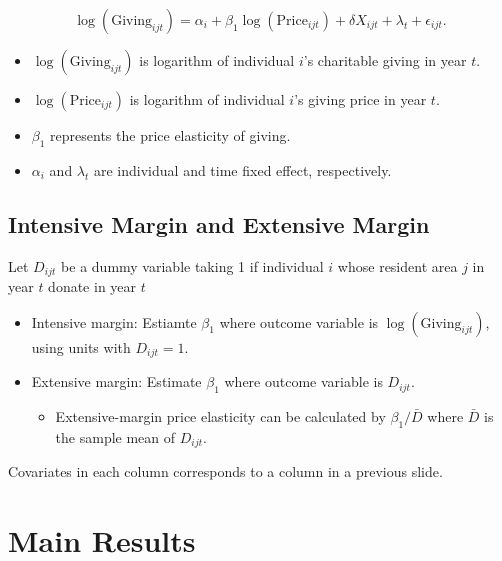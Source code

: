 \documentclass[ review  , 3p ]{elsarticle}
\providecommand{\tightlist}{%
  \setlength{\itemsep}{0pt}\setlength{\parskip}{0pt}}
\begin{document}
  \[
      \log(\text{Giving}_{ijt}) = 
      \alpha_i + \beta_1 \log(\text{Price}_{ijt}) + \delta X_{ijt} + \lambda_t + \epsilon_{ijt}.
  \]
  
  \begin{itemize}
  \tightlist
  \item
    \(\log(\text{Giving}_{ijt})\) is logarithm of individual \(i\)'s charitable giving in year \(t\).
  \item
    \(\log(\text{Price}_{ijt})\) is logarithm of individual \(i\)'s giving price in year \(t\).
  \item
    \(\beta_1\) represents the price elasticity of giving.
  \item
    \(\alpha_i\) and \(\lambda_t\) are individual and time fixed effect, respectively.
  \end{itemize}
  
  \hypertarget{intensive-margin-and-extensive-margin}{%
  \subsection{Intensive Margin and Extensive Margin}\label{intensive-margin-and-extensive-margin}}
  
  Let \(D_{ijt}\) be a dummy variable taking 1 if individual \(i\) whose resident area \(j\) in year \(t\) donate in year \(t\)
  
  \begin{itemize}
  \tightlist
  \item
    Intensive margin: Estiamte \(\beta_1\) where outcome variable is \(\log(\text{Giving}_{ijt})\), using units with \(D_{ijt} = 1\).
  \item
    Extensive margin: Estimate \(\beta_1\) where outcome variable is \(D_{ijt}\).
  
    \begin{itemize}
    \tightlist
    \item
      Extensive-margin price elasticity can be calculated by \(\beta_1/\bar{D}\) where \(\bar{D}\) is the sample mean of \(D_{ijt}\).
    \end{itemize}
  \end{itemize}
  
  Covariates in each column corresponds to a column in a previous slide.
  
  \hypertarget{main-results}{%
  \section{Main Results}\label{main-results}}
  
\end{document}
